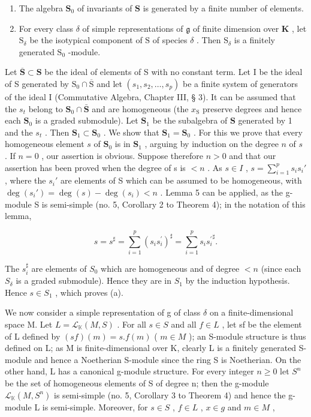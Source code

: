 \begin{enumerate}
\def\labelenumi{(\alph{enumi})}
\item
  The algebra \(\mathbf{S}_0\) of invariants of \(\mathbf{S}\) is generated by a finite number of elements.
\item
  For every class \(\delta\) of simple representations of \(\mathfrak{g}\) of finite dimension over \(\mathbf{K}\) , let \(\mathrm{S}_{\delta}\) be the isotypical component of \(\mathrm{S}\) of species \(\delta\) . Then \(\mathrm{S}_{\delta}\) is a finitely generated \(\mathrm{S}_{0}\) -module.
\end{enumerate}

Let \(\overline{\mathbf{S}}\subset \mathbf{S}\) be the ideal of elements of S with no constant term. Let I be the ideal of S generated by \(\mathrm{S}_0\cap \overline{\mathrm{S}}\) and let \((s_1,s_2,\ldots ,s_p)\) be a finite system of generators of the ideal I (Commutative Algebra, Chapter III, § 3). It can be assumed that the \(s_t\) belong to \(\mathbf{S}_0 \cap \bar{\mathbf{S}}\) and are homogeneous (the \(x_{\mathrm{S}}\) preserve degrees and hence each \(\mathbf{S}_0\) is a graded submodule). Let \(\mathbf{S}_1\) be the subalgebra of \(\mathbf{S}\) generated by 1 and the \(s_t\) . Then \(\mathbf{S}_1 \subset \mathbf{S}_0\) . We show that \(\mathbf{S}_1 = \mathbf{S}_0\) . For this we prove that every homogeneous element \(s\) of \(\mathbf{S}_0\) is in \(\mathbf{S}_1\) , arguing by induction on the degree \(n\) of \(s\) . If \(n = 0\) , our assertion is obvious. Suppose therefore \(n > 0\) and that our assertion has been proved when the degree of s is \(< n\) . As \(s \in I\) , \(s = \sum_{i=1}^{p} s_i s_i'\) , where the \(s_i'\) are elements of S which can be assumed to be homogeneous, with \(\deg(s_i') = \deg(s) - \deg(s_i) < n\) . Lemma 5 can be applied, as the g-module S is semi-simple (no. 5, Corollary 2 to Theorem 4); in the notation of this lemma,

\[
s = s ^ {\sharp} = \sum_ {i = 1} ^ {p} (s _ {i} s _ {i} ^ {\prime}) ^ {\sharp} = \sum_ {i = 1} ^ {p} s _ {i} {s _ {i} ^ {\prime}} ^ {\sharp}.
\]

The \(s_i^\sharp\) are elements of \(S_0\) which are homogeneous and of degree \(< n\) (since each \(S_\delta\) is a graded submodule). Hence they are in \(S_1\) by the induction hypothesis. Hence \(s \in S_1\) , which proves (a).

We now consider a simple representation of g of class \(\delta\) on a finite-dimensional space M. Let \(L = \mathcal{L}_{\mathbb{K}}(M, S)\) . For all \(s \in S\) and all \(f \in L\) , let sf be the element of L defined by \((sf)(m) = s.f(m)\) ( \(m \in M\) ); an S-module structure is thus defined on L; as M is finite-dimensional over K, clearly L is a finitely generated S-module and hence a Noetherian S-module since the ring S is Noetherian. On the other hand, L has a canonical g-module structure. For every integer \(n \geqslant 0\) let \(S^{n}\) be the set of homogeneous elements of S of degree n; then the g-module \(\mathcal{L}_{\mathbb{K}}(M, S^{n})\) is semi-simple (no. 5, Corollary 3 to Theorem 4) and hence the g-module L is semi-simple. Moreover, for \(s \in S\) , \(f \in L\) , \(x \in g\) and \(m \in M\) ,

